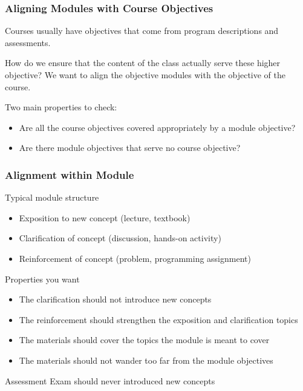 \documentclass[aspectratio=169]{beamer}
\begin{document}
\begin{frame}
  \frametitle{Aligning Modules with Course Objectives}
    Courses usually have objectives that come from program
    descriptions and assessments.

    How do we ensure that the content of the class actually serve
    these higher objective? We want to align the objective modules
    with the objective of the course.

    Two main properties to check:
    \begin{itemize}
    \item Are all the course objectives covered appropriately by a module objective?
    \item Are there module objectives that serve no course objective?
    \end{itemize}

\end{frame}

\begin{frame}
  \frametitle{Alignment within Module}

  \begin{block}{Typical module structure}
    \begin{itemize}
    \item Exposition to new concept (lecture, textbook)
    \item Clarification of concept (discussion, hands-on activity)
    \item Reinforcement of concept (problem, programming assignment)
    \end{itemize}
  \end{block}
  
  \begin{block}{Properties you want}
    \begin{itemize}
    \item The clarification should not introduce new concepts
    \item The reinforcement should strengthen the exposition and clarification topics
    \item The materials should cover the topics the module is meant to cover
    \item The materials should not wander too far from the module objectives
    \end{itemize}
  \end{block}

  \begin{block}{Assessment}
    Exam should never introduced new concepts
  \end{block}  
\end{frame}
\end{document}
